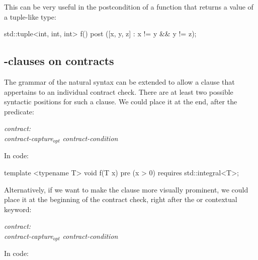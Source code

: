 This can be very useful in the postcondition of a function that returns a value of a tuple-like type:

\begin{codeblock}
std::tuple<int, int, int> f()
  post ([x, y, z] : x != y && y != z);
\end{codeblock}



\subsection{-clauses on contracts}
\label{subsec:requires}

The grammar of the natural syntax can be extended to allow a  clause that appertains to an individual contract check. There are at least two possible syntactic positions for such a  clause. We could place it at the end, after the predicate:

\begin{adjustwidth}{0.5cm}{0.5cm}
\emph{contract:} \\
\phantom{~~~}\emph{contract-capture}$_{opt}$ \emph{contract-condition} 

\end{adjustwidth}

In code:

\begin{codeblock}
template <typename T>
void f(T x)
  pre (x > 0) requires std::integral<T>;
\end{codeblock}

Alternatively, if we want to make the  clause more visually prominent, we could place it at the beginning of the contract check, right after the  or  contextual keyword:

\begin{adjustwidth}{0.5cm}{0.5cm}

\emph{contract:} \\
\phantom{~~~} \emph{contract-capture}$_{opt}$ \emph{contract-condition}

\end{adjustwidth}

In code:

